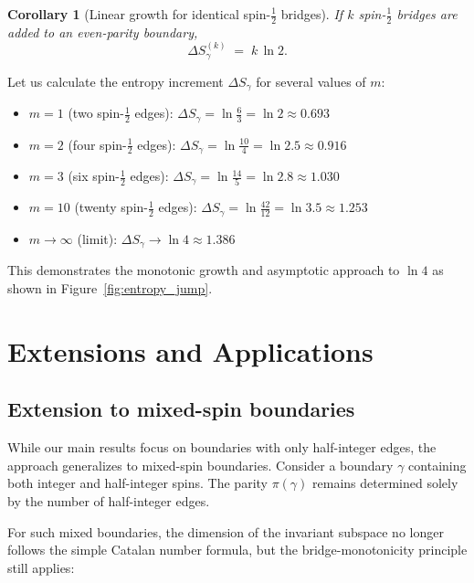 \documentclass[11pt, a4paper]{article}
\theoremstyle{plain}
\newtheorem{corollary}[theorem]{Corollary}
\theoremstyle{definition}
\theoremstyle{remark}
\begin{document}
\begin{corollary}[Linear growth for identical spin-$\tfrac12$ bridges]
\label{cor:linear}
If $k$ spin-$\tfrac12$ bridges are added to an even-parity boundary,
\[  \Delta S_{\gamma}^{(k)} \;=\; k\,\ln 2 .\]
\end{corollary}

\begin{example}
\label{ex:entropy_jumps}
Let us calculate the entropy increment $\Delta S_{\gamma}$ for several values of $m$:

\begin{itemize}
\item $m=1$ (two spin-$\frac{1}{2}$ edges): $\Delta S_{\gamma} = \ln\frac{6}{3} = \ln 2 \approx 0.693$
\item $m=2$ (four spin-$\frac{1}{2}$ edges): $\Delta S_{\gamma} = \ln\frac{10}{4} = \ln 2.5 \approx 0.916$
\item $m=3$ (six spin-$\frac{1}{2}$ edges): $\Delta S_{\gamma} = \ln\frac{14}{5} = \ln 2.8 \approx 1.030$
\item $m=10$ (twenty spin-$\frac{1}{2}$ edges): $\Delta S_{\gamma} = \ln\frac{42}{12} = \ln 3.5 \approx 1.253$
\item $m \to \infty$ (limit): $\Delta S_{\gamma} \to \ln 4 \approx 1.386$
\end{itemize}

This demonstrates the monotonic growth and asymptotic approach to $\ln 4$ as shown in Figure~\ref{fig:entropy_jump}.
\end{example}

\section{Extensions and Applications}
\label{sec:extensions}

\subsection{Extension to mixed-spin boundaries}
\label{sec:mixed_spin}

While our main results focus on boundaries with only half-integer edges, the approach generalizes to mixed-spin boundaries. Consider a boundary $\gamma$ containing both integer and half-integer spins. The parity $\pi(\gamma)$ remains determined solely by the number of half-integer edges.

For such mixed boundaries, the dimension of the invariant subspace no longer follows the simple Catalan number formula, but the bridge-monotonicity principle still applies:
\end{document}
